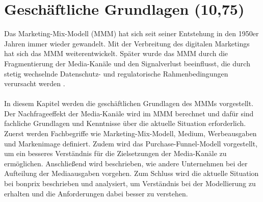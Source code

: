 \newpage
\section{Geschäftliche Grundlagen (10,75)}
\label{GeschäftlicheGrundlagen}
Das Marketing-Mix-Modell (\ac{MMM}) hat sich seit seiner Entstehung in den 1950er Jahren immer wieder gewandelt. Mit der Verbreitung des digitalen Marketings hat sich das \ac{MMM} weiterentwickelt. Später wurde das \ac{MMM} durch die Fragmentierung der Media-Kanäle und den Signalverlust beeinflusst, die durch stetig wechselnde Datenschutz- und regulatorische Rahmenbedingungen verursacht werden \cite[1]{MMMdef}.\\\\
In diesem Kapitel werden die geschäftlichen Grundlagen des \ac{MMM}s vorgestellt. Der Nachfrageeffekt der Media-Kanäle wird im \ac{MMM} berechnet und dafür sind fachliche Grundlagen und Kenntnisse über die aktuelle Situation erforderlich. Zuerst werden Fachbegriffe wie Marketing-Mix-Modell, Medium, Werbeausgaben und Markenimage definiert. Zudem wird das Purchase-Funnel-Modell vorgestellt, um ein besseres Verständnis für die Zielsetzungen der Media-Kanäle zu ermöglichen. Anschließend wird beschrieben, wie andere Unternehmen bei der Aufteilung der Mediaausgaben vorgehen. Zum Schluss wird die aktuelle Situation bei bonprix beschrieben und analysiert, um Verständnis bei der Modellierung zu erhalten und die Anforderungen dabei besser zu verstehen.
